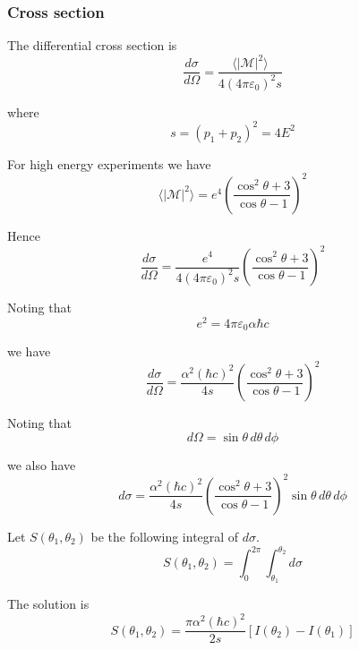 \subsubsection*{Cross section}

The differential cross section is
\begin{equation*}
\frac{d\sigma}{d\Omega}=\frac{\langle|\mathcal{M}|^2\rangle}{4(4\pi\varepsilon_0)^2s}
\end{equation*}

where
\begin{equation*}
s=(p_1+p_2)^2=4E^2
\end{equation*}

For high energy experiments we have
\begin{equation*}
\langle|\mathcal{M}|^2\rangle=e^4\left(\frac{\cos^2\theta+3}{\cos\theta-1}\right)^2
\end{equation*}

Hence
\begin{equation*}
\frac{d\sigma}{d\Omega}=\frac{e^4}{4(4\pi\varepsilon_0)^2s}
\left(\frac{\cos^2\theta+3}{\cos\theta-1}\right)^2
\end{equation*}

Noting that
\begin{equation*}
e^2=4\pi\varepsilon_0\alpha\hbar c
\end{equation*}

we have
\begin{equation*}
\frac{d\sigma}{d\Omega}
=\frac{\alpha^2(\hbar c)^2}{4s}
\left(\frac{\cos^2\theta+3}{\cos\theta-1}\right)^2
\end{equation*}

Noting that
\begin{equation*}
d\Omega=\sin\theta\,d\theta\,d\phi
\end{equation*}

we also have
\begin{equation*}
d\sigma=\frac{\alpha^2(\hbar c)^2}{4s}
\left(\frac{\cos^2\theta+3}{\cos\theta-1}\right)^2
\sin\theta\,d\theta\,d\phi
\end{equation*}

Let $S(\theta_1,\theta_2)$ be the following integral of $d\sigma$.
\begin{equation*}
S(\theta_1,\theta_2)=\int_0^{2\pi}\int_{\theta_1}^{\theta_2}d\sigma
\end{equation*}

The solution is
\begin{equation*}
S(\theta_1,\theta_2)=\frac{\pi\alpha^2(\hbar c)^2}{2s}[I(\theta_2)-I(\theta_1)]
\end{equation*}

